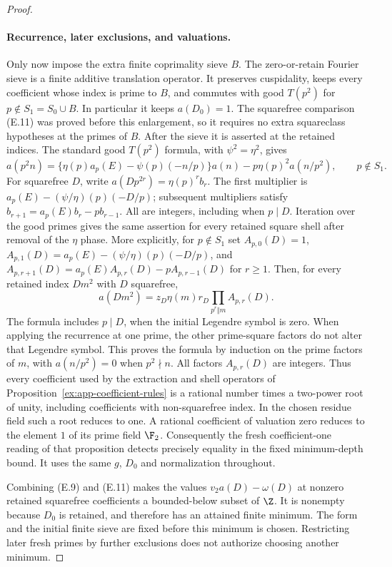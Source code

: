 \begin{proof}
\paragraph{Recurrence, later exclusions, and valuations.}
Only now impose the extra finite coprimality sieve $B$.
The zero-or-retain Fourier sieve is a finite additive translation
operator. It preserves cuspidality, keeps every coefficient whose
index is prime to $B$, and commutes with good $T(p^2)$ for
$p\notin S_1=S_0\cup B$. In particular it keeps $a(D_0)=1$.
The squarefree comparison (E.11) was proved before this enlargement,
so it requires no extra squareclass hypotheses at the primes of $B$.
After the sieve it is asserted at the retained indices.
The standard good $T(p^2)$ formula, with $\psi^2=\eta^2$, gives
\[
 a(p^2n)=\{\eta(p)a_p(E)-\psi(p)(-n/p)\}a(n)
                       -p\eta(p)^2a(n/p^2),\qquad p\notin S_1.
                                                        \tag{E.12}
\]
For squarefree $D$, write $a(Dp^{2r})=\eta(p)^r b_r$.
The first multiplier is
$a_p(E)-(\psi/\eta)(p)(-D/p)$; subsequent multipliers satisfy
$b_{r+1}=a_p(E)b_r-pb_{r-1}$. All are integers, including when
$p\mid D$. Iteration over the good primes gives the same assertion
for every retained square shell after removal of the $\eta$ phase.
More explicitly, for $p\notin S_1$ set
$A_{p,0}(D)=1$, $A_{p,1}(D)=a_p(E)-(\psi/\eta)(p)(-D/p)$,
and
$A_{p,r+1}(D)=a_p(E)A_{p,r}(D)-pA_{p,r-1}(D)$ for $r\ge1$.
Then, for every retained index $Dm^2$ with $D$ squarefree,
\[
 a(Dm^2)=z_D\eta(m)r_D
              \prod_{p^r\Vert m}A_{p,r}(D).
\]
The formula includes $p\mid D$, when the initial Legendre symbol
is zero. When applying the recurrence at one prime, the other
prime-square factors do not alter that Legendre symbol. This proves
the formula by induction on the prime factors of $m$, with
$a(n/p^2)=0$ when $p^2\nmid n$. All factors $A_{p,r}(D)$ are
integers. Thus every coefficient used by the extraction and shell
operators of Proposition~\ref{ex:app-coefficient-rules} is a rational
number times a two-power root of unity, including coefficients with
non-squarefree index. In the chosen residue field such a root reduces
to one. A rational coefficient of valuation zero reduces to the
element $1$ of its prime field $\F_2$. Consequently the fresh
coefficient-one reading of that proposition detects precisely equality
in the fixed minimum-depth bound. It uses the same $g$, $D_0$ and
normalization throughout.


Combining (E.9) and (E.11) makes the values
$v_2a(D)-\omega(D)$ at nonzero retained squarefree coefficients a
bounded-below subset of $\Z$. It is nonempty because $D_0$ is retained,
and therefore has an attained finite minimum. The form and the initial
finite sieve are fixed before this minimum is chosen. Restricting
later fresh primes by further exclusions does not authorize choosing
another minimum.
\end{proof}

